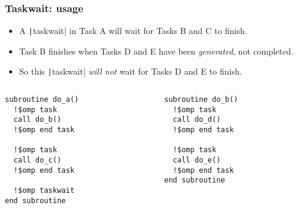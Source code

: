 \documentclass{beamer}
\begin{document}
\begin{frame}[fragile]
\frametitle{Taskwait: usage}

\begin{itemize}
  \item A \texttt|taskwait| in Task A will wait for Tasks B and C to finish.
  \item Task B finishes when Tasks D and E have been \emph{generated}, not completed.
  \item So this \texttt|taskwait| \emph{will not} wait for Tasks D and E to finish.
\end{itemize}

\begin{columns}
\begin{column}{0.5\textwidth}
\begin{verbatim}
subroutine do_a()
  !$omp task
  call do_b()
  !$omp end task

  !$omp task
  call do_c()
  !$omp end task

  !$omp taskwait
end subroutine

\end{verbatim}
\end{column}

\begin{column}{0.5\textwidth}
\begin{verbatim}
subroutine do_b()
  !$omp task
  call do_d()
  !$omp end task

  !$omp task
  call do_e()
  !$omp end task
end subroutine
\end{verbatim}
\end{column}

\end{columns}
\end{frame}
\end{document}
